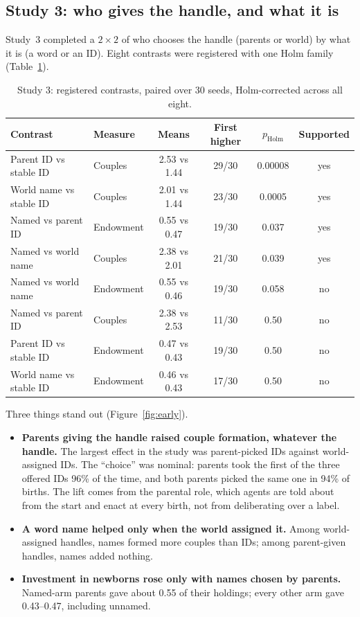 \documentclass[11pt]{article}
\newcommand{\pholm}{p_{\mathrm{Holm}}}
\begin{document}
\subsection{Study 3: who gives the handle, and what it is}

Study~3 completed a $2\times2$ of who chooses the handle (parents or world) by what it is (a word
or an ID). Eight contrasts were registered with one Holm family (Table~\ref{tab:twobytwo}).

\begin{table}[t]
\centering
\small
\caption{Study 3: registered contrasts, paired over 30 seeds, Holm-corrected across all eight.}
\label{tab:twobytwo}
\begin{tabular}{@{}l l c c c c@{}}
\toprule
Contrast & Measure & Means & First higher & $\pholm$ & Supported \\
\midrule
Parent ID vs stable ID & Couples & 2.53 vs 1.44 & 29/30 & 0.00008 & yes \\
World name vs stable ID & Couples & 2.01 vs 1.44 & 23/30 & 0.0005 & yes \\
Named vs parent ID & Endowment & 0.55 vs 0.47 & 19/30 & 0.037 & yes \\
Named vs world name & Couples & 2.38 vs 2.01 & 21/30 & 0.039 & yes \\
Named vs world name & Endowment & 0.55 vs 0.46 & 19/30 & 0.058 & no \\
Named vs parent ID & Couples & 2.38 vs 2.53 & 11/30 & 0.50 & no \\
Parent ID vs stable ID & Endowment & 0.47 vs 0.43 & 19/30 & 0.50 & no \\
World name vs stable ID & Endowment & 0.46 vs 0.43 & 17/30 & 0.50 & no \\
\bottomrule
\end{tabular}
\end{table}

Three things stand out (Figure~\ref{fig:early}).
\begin{itemize}
  \item \textbf{Parents giving the handle raised couple formation, whatever the handle.} The
        largest effect in the study was parent-picked IDs against world-assigned IDs. The
        ``choice'' was nominal: parents took the first of the three offered IDs 96\% of the time,
        and both parents picked the same one in 94\% of births. The lift comes from the parental
        role, which agents are told about from the start and enact at every birth, not from
        deliberating over a label.
  \item \textbf{A word name helped only when the world assigned it.} Among world-assigned handles,
        names formed more couples than IDs; among parent-given handles, names added nothing.
  \item \textbf{Investment in newborns rose only with names chosen by parents.} Named-arm parents
        gave about 0.55 of their holdings; every other arm gave 0.43--0.47, including unnamed.
\end{itemize}
\end{document}
